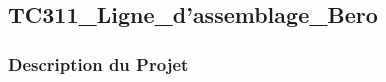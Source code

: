 \documentclass[a4paper,12pt]{report}
\begin{document}
\subsection{TC311\_Ligne\_d'assemblage\_Bero}
\begin{center}
\label{}
\end{center}

\subsubsection{Description du Projet}
\end{document}
